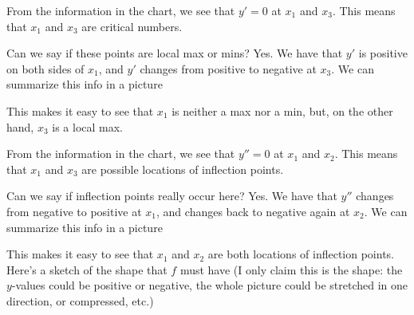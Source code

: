 \documentclass[oneside]{book}
\newcommand{\xtickmark}[2][]
{\ifx#1\relax\relax
  \draw [pin distance = 5pt,inner sep = 0pt,outer sep = 0pt, pin edge
  = thick](#2,0) 
     node[pin={[inner sep = 5pt]below:$#2$}]{}
  \else 
  \draw [pin distance = 5pt,inner sep =0pt, outer sep = 0pt, pin edge
  = thick](#2,0) 
     node[pin={[inner sep = 5pt]below:$#1$}]{}
  \fi}
\theoremstyle{definition}
\theoremstyle{solution}
\newtheorem*{solution}{Solution}
\newenvironment{solution}{\vspace{2in}\comment}{\endcomment}
\begin{document}
\begin{solution}
  From the information in the chart, we see that $y'=0$ at $x_1$ and
  $x_3$.  This means that $x_1$ and $x_3$ are critical numbers.

  Can we say if these points are local max or mins?  Yes.  We have
  that $y'$ is positive on both sides of $x_1$, and $y'$ changes from
  positive to negative at $x_3$.  We can summarize this info in a
  picture
\begin{center}
\end{center}
This makes it easy to see that $x_1$ is neither a max nor a min, but,
on the other hand, $x_3$ is a local max.

From the information in the chart, we see that $y''=0$ at $x_1$ and
$x_2$.  This means that $x_1$ and $x_3$ are possible locations of
inflection points.

Can we say if inflection points really occur here?  Yes.  We have that
$y''$ changes from negative to positive at $x_1$, and changes back to
negative again at $x_2$.  We can summarize this info in a picture
\begin{center}
\end{center}
This makes it easy to see that $x_1$ and $x_2$ are both locations of
inflection points.  Here's a sketch of the shape that $f$ must have (I
only claim this is the shape: the $y$-values could be positive or
negative, the whole picture could be stretched in one direction, or
compressed, etc.)
\begin{center}
\end{center}
\end{solution}
\end{document}
